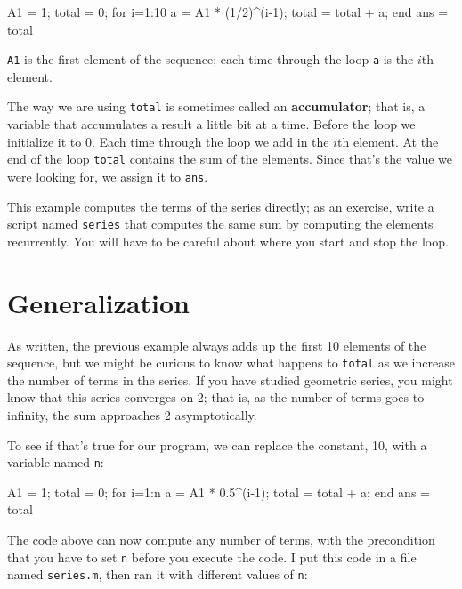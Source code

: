 \begin{code}
A1 = 1;
total = 0;
for i=1:10
    a = A1 * (1/2)^(i-1);
    total = total + a;
end
ans = total
\end{code}

{\tt A1} is the first element of the sequence; each time
through the loop {\tt a} is the $i$th element.


The way we are using {\tt total} is sometimes called an {\bf
accumulator}; that is, a variable that accumulates a result a little
bit at a time.  
Before the loop we initialize it to 0.  
Each time
through the loop we add in the $i$th element.  
At the end of the loop
{\tt total} contains the sum of the elements.  
Since that's the value
we were looking for, we assign it to {\tt ans}.

\begin{ex}
This example computes the terms of the series directly; as
an exercise, write a script named {\tt series} that computes
the same sum by computing the elements recurrently.  You will
have to be careful about where you start and stop the loop.
\end{ex}


\section{Generalization}


As written, the previous example always adds up the first 10
elements of the sequence, but we might be curious to know what
happens to {\tt total} as we increase the
number of terms in the series.  If you have studied geometric
series, you might know that this series converges on 2; that is,
as the number of terms goes to infinity, the sum approaches
2 asymptotically.

To see if that's true for our program, we can replace the
constant, 10, with a variable named {\tt n}:

\begin{code}
A1 = 1;
total = 0;
for i=1:n
    a = A1 * 0.5^(i-1);
    total = total + a;
end
ans = total
\end{code}

The code above can now compute any number of terms, with the
precondition that you have to set {\tt n} before you execute
the code.  
I put this code in a file named {\tt series.m}, then
ran it with different values of {\tt n}:

